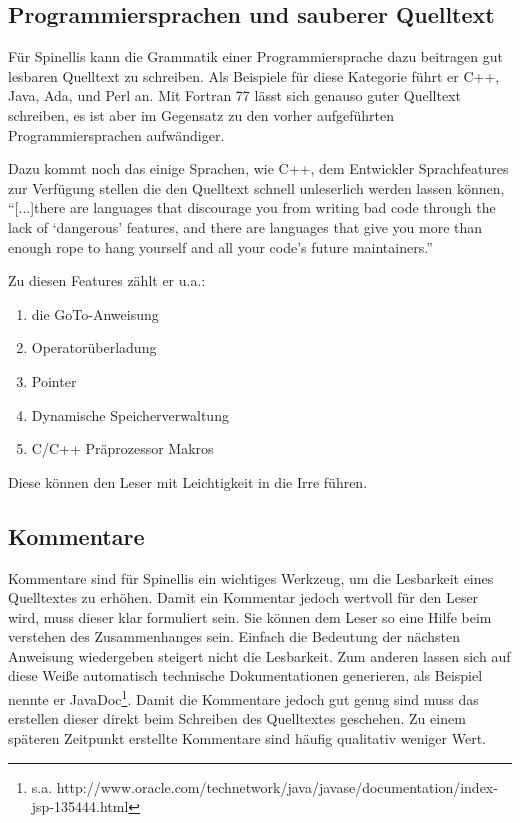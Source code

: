 \subsection{Programmiersprachen und sauberer Quelltext}
Für Spinellis kann die Grammatik einer Programmiersprache dazu beitragen gut lesbaren Quelltext zu schreiben. Als Beispiele für diese Kategorie führt er C++, Java, Ada, und Perl an. Mit Fortran 77 lässt sich genauso guter Quelltext schreiben, es ist aber im Gegensatz zu den vorher aufgeführten Programmiersprachen aufwändiger. \cite[S. 87]{Spinellis}

Dazu kommt noch das einige Sprachen, wie C++, dem Entwickler Sprachfeatures zur Verfügung stellen die den Quelltext schnell unleserlich werden lassen können, \enquote{[...]there are languages that discourage you from writing bad code through the lack of \enquote{dangerous} features, and there are languages that give you more than enough rope to hang yourself and all your code’s future maintainers.}\cite[S. 87]{Spinellis}

Zu diesen Features zählt er u.a.:
\begin{enumerate}
\item die GoTo-Anweisung
\item Operatorüberladung
\item Pointer
\item Dynamische Speicherverwaltung 
\item C/C++ Präprozessor Makros
\end{enumerate}

Diese können den Leser mit Leichtigkeit in die Irre führen.

\subsection{Kommentare}
Kommentare sind für Spinellis ein wichtiges Werkzeug, um die Lesbarkeit eines Quelltextes zu erhöhen. Damit ein Kommentar jedoch wertvoll für den Leser wird, muss dieser klar formuliert sein. Sie können dem Leser so eine Hilfe beim verstehen des Zusammenhanges sein. Einfach die Bedeutung der nächsten Anweisung wiedergeben steigert nicht die Lesbarkeit. Zum anderen lassen sich auf diese Weiße automatisch technische Dokumentationen generieren, als Beispiel nennte er JavaDoc\footnote{s.a. http://www.oracle.com/technetwork/java/javase/documentation/index-jsp-135444.html}. Damit die Kommentare jedoch gut genug sind muss das erstellen dieser direkt beim Schreiben des Quelltextes geschehen. Zu einem späteren Zeitpunkt erstellte Kommentare sind häufig qualitativ weniger Wert. \cite[S. 88]{Spinellis}

